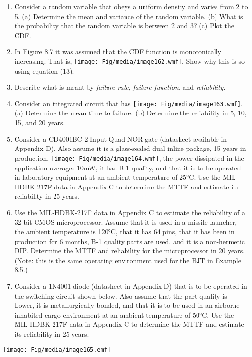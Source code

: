 \begin{enumerate}
\def\labelenumi{\arabic{enumi}.}
\item
  Consider a random variable that obeys a uniform density and varies
  from 2 to 5. (a) Determine the mean and variance of the random
  variable. (b) What is the probability that the random variable is
  between 2 and 3? (c) Plot the CDF.
\item
  In Figure 8.7 it was assumed that the CDF function is monotonically
  increasing. That is, \texttt{[image: Fig/media/image162.wmf]}. Show
  why this is so using equation (13).
\item
  Describe what is meant by \emph{failure rate}, \emph{failure
  function}, and \emph{reliability}.
\item
  Consider an integrated circuit that has
  \texttt{[image: Fig/media/image163.wmf]}. (a) Determine the mean time
  to failure. (b) Determine the reliability in 5, 10, 15, and 20 years.
\item
  Consider a CD4001BC 2-Input Quad NOR gate (datasheet available in
  Appendix D). Also assume it is a glass-sealed dual inline package, 15
  years in production, \texttt{[image: Fig/media/image164.wmf]}, the
  power dissipated in the application averages 10mW, it has B-1 quality,
  and that it is to be operated in laboratory equipment at an ambient
  temperature of 25°C. Use the MIL-HDBK-217F data in Appendix C to
  determine the MTTF and estimate its reliability in 25 years.
\item
  Use the MIL-HDBK-217F data in Appendix C to estimate the reliability
  of a 32 bit CMOS microprocessor. Assume that it is used in a missile
  launcher, the ambient temperature is 120°C, that it has 64 pins, that
  it has been in production for 6 months, B-1 quality parts are used,
  and it is a non-hermetic DIP. Determine the MTTF and reliability for
  the microprocessor in 20 years. (Note: this is the same operating
  environment used for the BJT in Example 8.5.)
\item
  Consider a 1N4001 diode (datasheet in Appendix D) that is to be
  operated in the switching circuit shown below. Also assume that the
  part quality is Lower, it is metallurgically bonded, and that it is to
  be used in an airborne inhabited cargo environment at an ambient
  temperature of 50°C. Use the MIL-HDBK-217F data in Appendix C to
  determine the MTTF and estimate its reliability in 25 years.
\end{enumerate}

\texttt{[image: Fig/media/image165.emf]}

